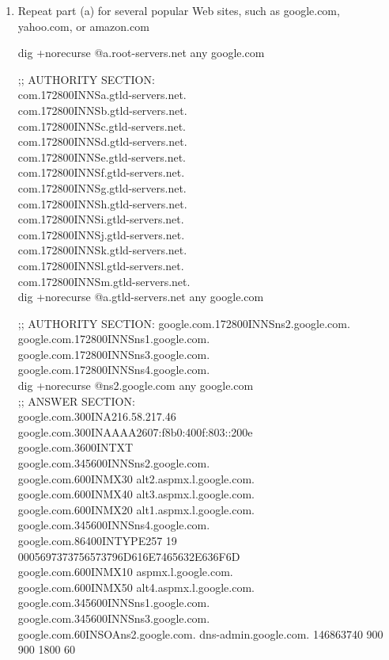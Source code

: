 \documentclass[11pt]{article}
\begin{document}
\begin{enumerate}[label=(\alph*)]
\item Repeat part (a) for several popular Web sites, such as google.com, yahoo.com, or amazon.com

dig +norecurse @a.root-servers.net any google.com

;; AUTHORITY SECTION:\\
com.172800INNSa.gtld-servers.net.\\
com.172800INNSb.gtld-servers.net.\\
com.172800INNSc.gtld-servers.net.\\
com.172800INNSd.gtld-servers.net.\\
com.172800INNSe.gtld-servers.net.\\
com.172800INNSf.gtld-servers.net.\\
com.172800INNSg.gtld-servers.net.\\
com.172800INNSh.gtld-servers.net.\\
com.172800INNSi.gtld-servers.net.\\
com.172800INNSj.gtld-servers.net.\\
com.172800INNSk.gtld-servers.net.\\
com.172800INNSl.gtld-servers.net.\\
com.172800INNSm.gtld-servers.net.\\

dig +norecurse @a.gtld-servers.net any google.com

;; AUTHORITY SECTION:
google.com.172800INNSns2.google.com.\\
google.com.172800INNSns1.google.com.\\
google.com.172800INNSns3.google.com.\\
google.com.172800INNSns4.google.com.\\


dig +norecurse @ns2.google.com any google.com\\

;; ANSWER SECTION:\\
google.com.300INA216.58.217.46\\
google.com.300INAAAA2607:f8b0:400f:803::200e\\
google.com.3600INTXT\\
google.com.345600INNSns2.google.com.\\
google.com.600INMX30 alt2.aspmx.l.google.com.\\
google.com.600INMX40 alt3.aspmx.l.google.com.\\
google.com.600INMX20 alt1.aspmx.l.google.com.\\
google.com.345600INNSns4.google.com.\\
google.com.86400INTYPE257 19 0005697373756573796D616E7465632E636F6D\\
google.com.600INMX10 aspmx.l.google.com.\\
google.com.600INMX50 alt4.aspmx.l.google.com.\\
google.com.345600INNSns1.google.com.\\
google.com.345600INNSns3.google.com.\\
google.com.60INSOAns2.google.com. dns-admin.google.com. 146863740 900 900 1800 60\\



\end{enumerate}
\end{document}
